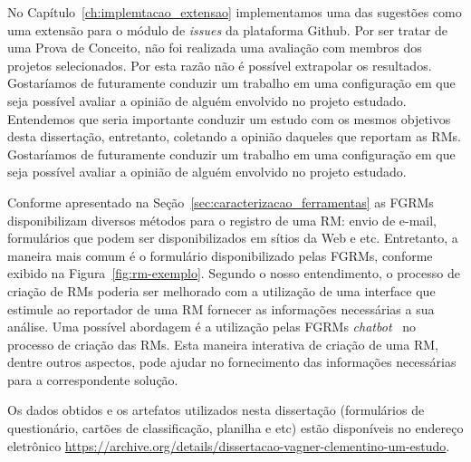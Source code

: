 No Capítulo~\ref{ch:implemtacao_extensao} implementamos uma das sugestões como
uma extensão para o módulo de \textit{issues} da plataforma Github. Por ser
tratar de uma Prova de Conceito, não foi realizada uma avaliação com membros dos
projetos selecionados. Por esta razão não é possível extrapolar os resultados.
Gostaríamos de futuramente conduzir um trabalho em uma configuração em que seja
possível avaliar a opinião de alguém envolvido no projeto estudado. Entendemos
que seria importante conduzir um estudo com os mesmos objetivos desta
dissertação, entretanto, coletando a opinião daqueles que reportam as RMs.
Gostaríamos de futuramente conduzir um trabalho em uma configuração em que seja
possível avaliar a opinião de alguém envolvido no projeto estudado.

Conforme apresentado na Seção~\ref{sec:caracterizacao_ferramentas} as FGRMs
disponibilizam diversos métodos para o registro de uma RM\@: envio de e-mail,
formulários que podem ser disponibilizados em sítios da Web e etc. Entretanto,
a maneira mais comum é o formulário disponibilizado pelas FGRMs, conforme
exibido na Figura~\ref{fig:rm-exemplo}. Segundo o nosso entendimento, o
processo de criação de RMs poderia ser melhorado com a utilização de uma
interface que estimule ao reportador de uma RM fornecer as informações
necessárias a sua análise. Uma possível abordagem é a utilização pelas FGRMs
\textit{chatbot}~\cite{mauldin1994chatterbots,huang2007extracting} no processo
de criação das RMs. Esta maneira interativa de criação de uma RM, dentre outros
aspectos, pode ajudar no fornecimento das informações necessárias para a
correspondente solução.

Os dados obtidos e os artefatos utilizados nesta dissertação (formulários de
questionário, cartões de classificação, planilha e etc) estão disponíveis no
endereço eletrônico
\url{https://archive.org/details/dissertacao-vagner-clementino-um-estudo}.

